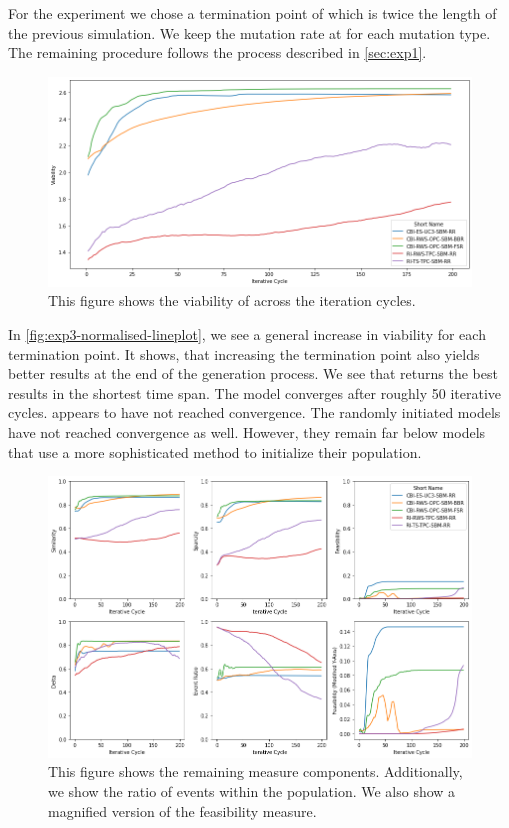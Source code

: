 \documentclass[./../../paper.tex]{subfiles}
\begin{document}
For the experiment we chose a termination point of  which is twice the length of the previous simulation. We keep the mutation rate at  for each mutation type. The remaining procedure follows the process described in \autoref{sec:exp1}.

\begin{figure}[htbp]
    \centering
    \includegraphics[width=\textwidth]{figures/generated/exp3_relative_cycles.png}
    \caption{This figure shows the viability of across the iteration cycles.}
    \label{fig:exp3-normalised-lineplot}
\end{figure}

In \autoref{fig:exp3-normalised-lineplot}, we see a general increase in viability for each termination point. It shows, that increasing the termination point also yields better results at the end of the generation process. 
We see that  returns the best results in the shortest time span. The model converges after roughly 50 iterative cycles.  appears to have not reached convergence. 
The randomly initiated models have not reached convergence as well. However, they remain far below models that use a more sophisticated method to initialize their population. 

\begin{figure}[htbp]
    \centering
    \includegraphics[width=\textwidth]{figures/generated/exp3_cycles_components.png}
    \caption{This figure shows the remaining measure components. Additionally, we show the ratio of events within the population. We also show a magnified version of the feasibility measure.}
    \label{fig:exp3-components}
\end{figure}
\end{document}
